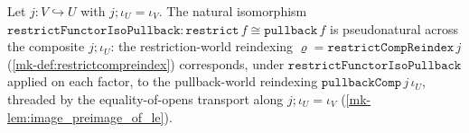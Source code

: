 \begin{lemma}\label{mk-lem:restrictfunctorisopullback_comp_compat}
  \leanok

  Let \(j : V \hookrightarrow U\) with \(j \mathbin{;} \iota_U = \iota_V\). The natural isomorphism
  \(\mathtt{restrictFunctorIsoPullback} : \mathtt{restrict}\,f \cong \mathtt{pullback}\,f\) is
  pseudonatural across the composite \(j \mathbin{;} \iota_U\): the restriction-world reindexing
  \(\varrho = \mathtt{restrictCompReindex}\,j\) (\ref{mk-def:restrictcompreindex}) corresponds, under
  \(\mathtt{restrictFunctorIsoPullback}\) applied on each factor, to the pullback-world reindexing
  \(\mathtt{pullbackComp}\,j\,\iota_U\), threaded by the equality-of-opens transport along
  \(j \mathbin{;} \iota_U = \iota_V\) (\ref{mk-lem:image_preimage_of_le}).
\end{lemma}
